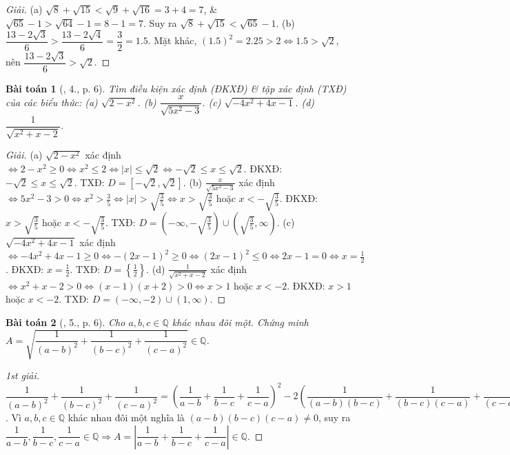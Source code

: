 \documentclass{article}
\newtheorem{baitoan}{Bài toán}
\begin{document}
\begin{proof}[Giải]
	(a) $\sqrt{8} + \sqrt{15} < \sqrt{9} + \sqrt{16} = 3 + 4 = 7$, \& $\sqrt{65} - 1 > \sqrt{64} - 1 = 8 - 1 = 7$. Suy ra $\sqrt{8} + \sqrt{15} < \sqrt{65} - 1$. (b) $\dfrac{13 - 2\sqrt{3}}{6} > \dfrac{13 - 2\sqrt{4}}{6} = \dfrac{3}{2} = 1.5$. Mặt khác, $(1.5)^2 = 2.25 > 2\Leftrightarrow 1.5 > \sqrt{2}$, nên $\dfrac{13 - 2\sqrt{3}}{6} > \sqrt{2}$.
\end{proof}

\begin{baitoan}[\cite{Tuyen_Toan_9}, 4., p. 6]
	Tìm điều kiện xác định (ĐKXĐ) \& tập xác định (TXĐ) của các biểu thức: (a) $\sqrt{2 - x^2}$. (b) $\dfrac{x}{\sqrt{5x^2 - 3}}$. (c) $\sqrt{-4x^2 + 4x - 1}$. (d) $\dfrac{1}{\sqrt{x^2 + x - 2}}$.
\end{baitoan}

\begin{proof}[Giải]
	(a) $\sqrt{2 - x^2}$ xác định $\Leftrightarrow2 - x^2\ge0\Leftrightarrow x^2\le2\Leftrightarrow|x|\le\sqrt{2}\Leftrightarrow-\sqrt{2}\le x\le\sqrt{2}$. ĐKXĐ: $-\sqrt{2}\le x\le\sqrt{2}$. TXĐ: $D = [-\sqrt{2},\sqrt{2}]$. (b) $\frac{x}{\sqrt{5x^2 - 3}}$ xác định $\Leftrightarrow 5x^2 - 3 > 0\Leftrightarrow x^2 > \frac{3}{5}\Leftrightarrow|x| > \sqrt{\frac{3}{5}}\Leftrightarrow x > \sqrt{\frac{3}{5}}$ hoặc $x < -\sqrt{\frac{3}{5}}$. ĐKXĐ: $x > \sqrt{\frac{3}{5}}$ hoặc $x < -\sqrt{\frac{3}{5}}$. TXĐ: $D = \left(-\infty,-\sqrt{\frac{3}{5}}\right)\cup\left(\sqrt{\frac{3}{5}},\infty\right)$. (c) $\sqrt{-4x^2 + 4x - 1}$ xác định $\Leftrightarrow-4x^2 + 4x - 1\ge0\Leftrightarrow-(2x - 1)^2\ge0\Leftrightarrow(2x - 1)^2\le0\Leftrightarrow2x - 1 = 0\Leftrightarrow x = \frac{1}{2}$. ĐKXĐ: $x = \frac{1}{2}$. TXĐ: $D = \left\{\frac{1}{2}\right\}$. (d) $\frac{1}{\sqrt{x^2 + x - 2}}$ xác định $\Leftrightarrow x^2 + x - 2 > 0\Leftrightarrow(x - 1)(x + 2) > 0\Leftrightarrow x > 1$ hoặc $x < -2$. ĐKXĐ: $x > 1$ hoặc $x < -2$. TXĐ: $D = (-\infty,-2)\cup(1,\infty)$.
\end{proof}

\begin{baitoan}[\cite{Tuyen_Toan_9}, 5., p. 6]
	Cho $a,b,c\in\mathbb{Q}$ khác nhau đôi một. Chứng minh $A = \sqrt{\dfrac{1}{(a - b)^2} + \dfrac{1}{(b - c)^2} + \dfrac{1}{(c - a)^2}}\in\mathbb{Q}$.
\end{baitoan}

\begin{proof}[1st giải]
	$\dfrac{1}{(a - b)^2} + \dfrac{1}{(b - c)^2} + \dfrac{1}{(c - a)^2} = \left(\dfrac{1}{a - b} + \dfrac{1}{b - c} + \dfrac{1}{c - a}\right)^2 - 2\left(\dfrac{1}{(a - b)(b - c)} + \dfrac{1}{(b - c)(c - a)} + \dfrac{1}{(c - a)(a - b)}\right) = \left(\dfrac{1}{a - b} + \dfrac{1}{b - c} + \dfrac{1}{c - a}\right)^2 - \dfrac{2(c - a + a - b + b - c)}{(a - b)(b - c)(c - a)} = \left(\dfrac{1}{a - b} + \dfrac{1}{b - c} + \dfrac{1}{c - a}\right)^2\Rightarrow A = \left|\dfrac{1}{a - b} + \dfrac{1}{b - c} + \dfrac{1}{c - a}\right|$. Vì $a,b,c\in\mathbb{Q}$ khác nhau đôi một nghĩa là $(a - b)(b - c)(c - a)\ne0$, suy ra $\dfrac{1}{a - b},\dfrac{1}{b - c},\dfrac{1}{c - a}\in\mathbb{Q}\Rightarrow A = \left|\dfrac{1}{a - b} + \dfrac{1}{b - c} + \dfrac{1}{c - a}\right|\in\mathbb{Q}$.
\end{proof}
\end{document}
